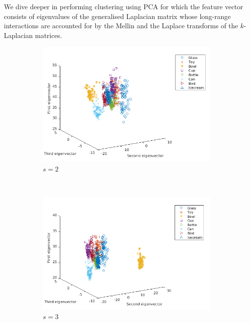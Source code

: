 \documentclass[10pt,a4paper]{article}
\begin{document}
We dive deeper in performing clustering using PCA for which the feature vector consists of eigenvalues of the generalised Laplacian matrix whose long-range interactions are accounted for by the Mellin and the Laplace transforms of the $k$-Laplacian matrices.

\begin{figure}[H]
	\centering
	\begin{subfigure}[b]{0.5\textwidth}
		\includegraphics[width= \textwidth]{images/Mellin-s2.png}
		\caption{$s=2$}
		\label{}
	\end{subfigure}~
	\begin{subfigure}[b]{0.5\textwidth}
		\includegraphics[width= \textwidth]{images/Mellin-s3.png}
		\caption{$s=3$}
		\label{}
	\end{subfigure}\\
	\begin{subfigure}[b]{0.5\textwidth}

\end{subfigure}
\end{figure}
\end{document}
